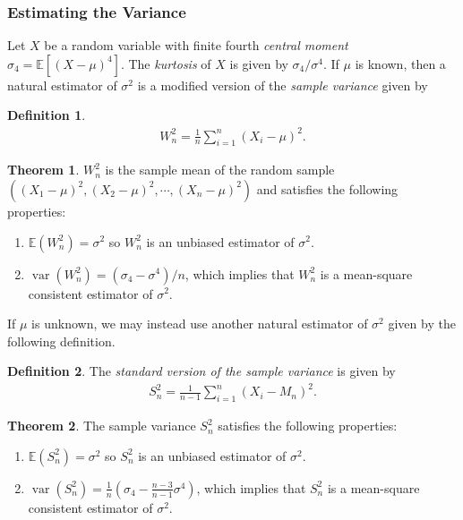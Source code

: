 \documentclass[a4paper,12pt]{article}
\theoremstyle{definition}
\newtheorem{theorem}{Theorem}[section]
\theoremstyle{definition}
\theoremstyle{definition}
\newtheorem{definition}{Definition}[section]
\newcommand{\var}{\operatorname{var}}
\begin{document}
    \subsubsection*{Estimating the Variance}
    Let $X$ be a random variable with finite fourth \textit{central moment} $\sigma_4 = \mathbb{E} \left[ (X - \mu)^4 \right]$. The \textit{kurtosis} of $X$ is given by $\sigma_4 / \sigma^4$. If $\mu$ is known, then a natural estimator of $\sigma^2$ is a modified version of the \textit{sample variance} given by
    \begin{definition}
        \begin{align*}
            W_n^2 = \frac{1}{n} \sum_{i = 1}^n (X_i - \mu)^2.
        \end{align*}
    \end{definition}
    \begin{theorem}
        $W_n^2$ is the sample mean of the random sample $((X_1 - \mu)^2, (X_2 - \mu)^2, \cdots, (X_n - \mu)^2)$ and satisfies the following properties:
        \begin{enumerate}[label=\alph*.]
            \item
                $\mathbb{E}(W_n^2) = \sigma^2$ so $W_n^2$ is an unbiased estimator of $\sigma^2$.
            \item
                $\var(W_n^2) = (\sigma_4 - \sigma^4) / n$, which implies that $W_n^2$ is a mean-square consistent estimator of $\sigma^2$.
        \end{enumerate}
    \end{theorem}
    If $\mu$ is unknown, we may instead use another natural estimator of $\sigma^2$ given by the following definition.
    \begin{definition}
        The \textit{standard version of the sample variance} is given by
        \begin{align*}
            S_n^2 = \frac{1}{n - 1} \sum_{i = 1}^n (X_i - M_n)^2.
        \end{align*}
    \end{definition}
    \begin{theorem}
        The sample variance $S_n^2$ satisfies the following properties:
        \begin{enumerate}[label=\alph*.]
            \item
                $\mathbb{E}(S_n^2) = \sigma^2$ so $S_n^2$ is an unbiased estimator of $\sigma^2$.
            \item
                $\var(S_n^2) = \frac{1}{n} \left( \sigma_4 - \frac{n - 3}{n - 1} \sigma^4 \right)$, which implies that $S_n^2$ is a mean-square consistent estimator of $\sigma^2$.
        \end{enumerate}
    \end{theorem}
\end{document}
